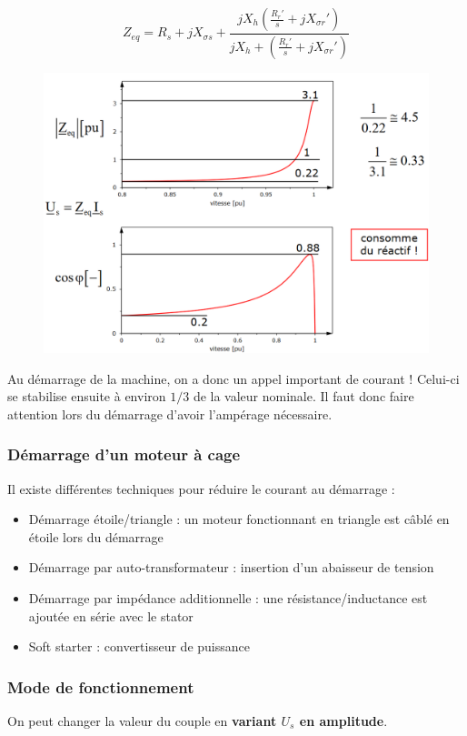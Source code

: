 \documentclass[../main.tex]{subfiles}
\begin{document}
\begin{equation}
    Z_{eq} = R_s + j X_{\sigma s} + \frac{jX_h(\frac{R_r'}{s} + j X_{\sigma r}')}{jX_h + (\frac{R_r'}{s} + jX_{\sigma r}')}
\end{equation}

\begin{figure}[hbt!]
    \centering
    \includegraphics[width=.7\textwidth]{IMAGES/elec/elecimpe.png}
\end{figure}

\warning Au démarrage de la machine, on a donc un appel important de courant ! Celui-ci se stabilise ensuite à environ $1/3$ de la valeur nominale. Il faut donc faire attention lors du démarrage d'avoir l'ampérage nécessaire.\\

\subsubsection{Démarrage d'un moteur à cage}
Il existe différentes techniques pour réduire le courant au démarrage : \begin{itemize}
    \item Démarrage étoile/triangle : un moteur fonctionnant en triangle est câblé en étoile lors du démarrage\\
    \item Démarrage par auto-transformateur : insertion d'un abaisseur de tension\\
    \item Démarrage par impédance additionnelle : une résistance/inductance est ajoutée en série avec le stator\\
    \item Soft starter : convertisseur de puissance\\
\end{itemize}

\subsubsection{Mode de fonctionnement}
On peut changer la valeur du couple en \textbf{variant $U_s$ en amplitude}.\\
\end{document}
